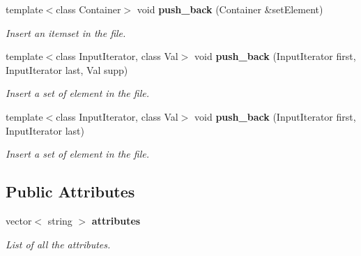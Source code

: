\begin{CompactItemize}
template$<$class Container$>$ void {\bf push\_\-back} (Container \&set\-Element)
\begin{CompactList}\small\item\em Insert an itemset in the file. \item\end{CompactList}\item 
template$<$class Input\-Iterator, class Val$>$ void {\bf push\_\-back} (Input\-Iterator first, Input\-Iterator last, Val supp)
\begin{CompactList}\small\item\em Insert a set of element in the file. \item\end{CompactList}\item 
template$<$class Input\-Iterator, class Val$>$ void {\bf push\_\-back} (Input\-Iterator first, Input\-Iterator last)
\begin{CompactList}\small\item\em Insert a set of element in the file. \item\end{CompactList}\end{CompactItemize}
\subsection*{Public Attributes}
\begin{CompactItemize}
\item 
vector$<$ string $>$ {\bf attributes}\label{class_tabular_d_b_file_a2966fce4c41b8ee7c386c3ff663afd6}

\begin{CompactList}\small\item\em List of all the attributes. \item\end{CompactList}\end{CompactItemize}
